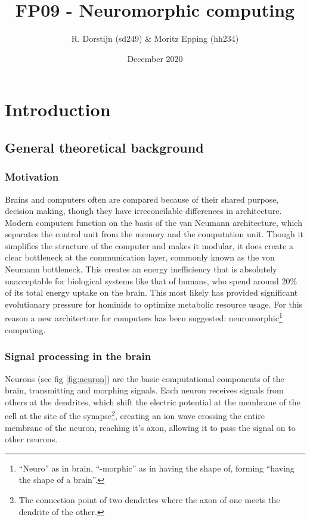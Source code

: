 \documentclass[a4paper]{article}
\title{FP09 - Neuromorphic computing}
\author{R. Dorstijn (sd249) \& Moritz Epping (hh234)}
\date{December 2020}
\begin{document}
\maketitle
\clearpage
\tableofcontents
\clearpage

\section{Introduction}
\subsection{General theoretical background}
\subsubsection{Motivation}
Brains and computers often are compared because of their shared purpose,
decision making, though they have irreconcilable differences in architecture.
Modern computers function on the basis of the van Neumann
architecture\cite{von-Neumann}, which separates the control unit from the memory
and the computation unit. Though it simplifies the structure of the computer and
makes it modular, it does create a clear bottleneck at the communication layer,
commonly known as the von Neumann bottleneck. This creates an energy
inefficiency that is absolutely unacceptable for biological systems like that of
humans, who spend around 20\% of its total energy uptake on the brain\cite{metabolic-rates}.
This most likely has provided significant evolutionary pressure for hominids to
optimize metabolic resource usage\cite{seymour2016fossil}. For this reason a new
architecture for computers has been suggested: neuromorphic\footnote{``Neuro''
as in brain, ``-morphic'' as in having the shape of, forming ``having the shape
of a brain''.} computing.

\subsubsection{Signal processing in the brain}
Neurons (see fig \ref{fig:neuron}) are the basic computational components of the
brain, transmitting and morphing signals. Each neuron receives signals from
others at the dendrites, which shift the electric potential at the membrane of
the cell at the site of the synapse\footnote{The connection point of two
dendrites where the axon of one meets the dendrite of the other.}, creating an
ion wave crossing the entire membrane of the neuron, reaching it's axon,
allowing it to pass the signal on to other neurons.
\end{document}
